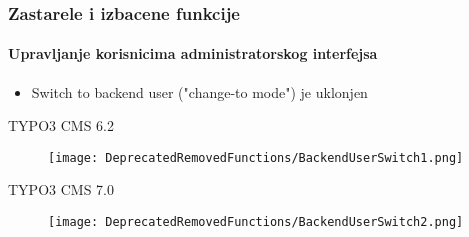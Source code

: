 
\begin{frame}[fragile]
	\frametitle{Zastarele i izbacene funkcije}
	\framesubtitle{Upravljanje korisnicima administratorskog interfejsa}

	\begin{itemize}
		\item Switch to backend user ("change-to mode") je uklonjen
	\end{itemize}

	\smaller\tabto{1cm}\begingroup\color{typo3red}TYPO3 CMS 6.2\endgroup\normalsize
	\begin{figure}\vspace{-0.4cm}
		\texttt{[image: DeprecatedRemovedFunctions/BackendUserSwitch1.png]}
	\end{figure}

	\smaller\tabto{1cm}\begingroup\color{typo3red}TYPO3 CMS 7.0\endgroup\normalsize
	\begin{figure}\vspace{-0.4cm}
		\texttt{[image: DeprecatedRemovedFunctions/BackendUserSwitch2.png]}
	\end{figure}

\end{frame}



